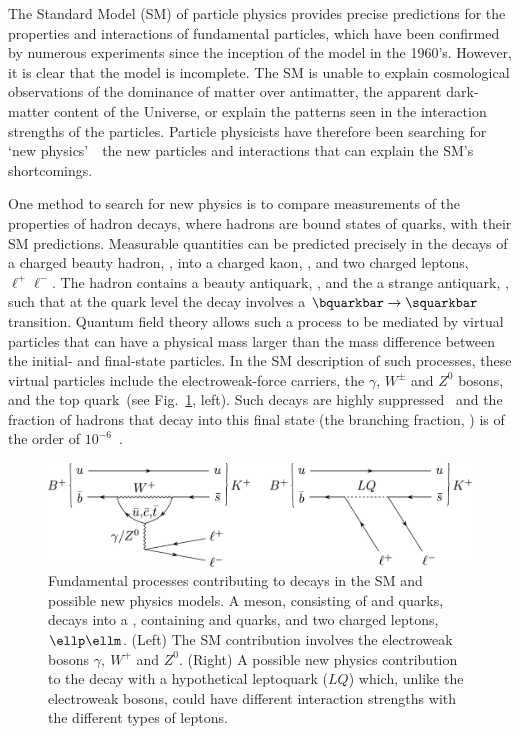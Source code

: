The Standard Model (SM) of particle physics provides precise predictions for the properties and interactions of fundamental particles, which have been confirmed by numerous experiments since the inception of the model in the 1960’s. However, it is clear that the model is incomplete. The SM is unable to explain cosmological observations of the dominance of matter over antimatter,  the apparent dark-matter content of the Universe,  or explain the patterns seen in the interaction strengths of the particles.
Particle physicists have therefore been searching for ‘new physics’~\textemdash~the new particles and interactions that can explain the SM’s shortcomings. 

One method to search for new physics is to compare measurements of the properties of hadron decays, where hadrons are bound states of quarks, with their SM predictions. Measurable quantities can be predicted precisely  in the decays 
of a charged beauty hadron, \Bp, into a charged kaon, \Kp, and two charged leptons,~$\ell^{+}\ell^{-}$. The \Bp hadron contains a beauty antiquark, \bquarkbar, and the \Kp a strange antiquark, \squarkbar, such that at the quark level the decay involves a $\bquarkbar\to\squarkbar$ transition.
Quantum field theory allows such a process to be mediated by virtual particles that can have a physical mass larger than the mass difference between the initial- and final-state particles. In the SM description of such processes, these virtual particles include the electroweak-force carriers, the $\gamma$, $W^{\pm}$ and $Z^0$ bosons, and the top quark~(see Fig.~\ref{fig:feyn}, left). Such decays are highly suppressed~\cite{Glashow:1970gm} and the fraction of \Bp hadrons that decay into this final state (the branching fraction, \BR) is of the order of $10^{-6}$~\cite{PDG2020}.

\begin{figure}[b!]
   \begin{center}
      \includegraphics[width=0.96\linewidth]{figures/Fig1.pdf}
   \end{center}
   \vspace*{-0.5cm}
   \caption{
  Fundamental processes contributing to \BuKll decays in the SM and possible new physics models. A \Bp meson, consisting of \bquarkbar and \uquark quarks, decays into a \Kp, containing \squarkbar and \uquark quarks, and two charged leptons, $\ellp\ellm$. (Left) The SM contribution involves the electroweak bosons $\gamma,~W^+$ and $Z^0$. (Right) A possible new physics contribution to the decay with a hypothetical leptoquark ($LQ$) which, unlike the electroweak bosons, could have different interaction strengths with the different types of leptons.     
   }\label{fig:feyn}
\end{figure}

